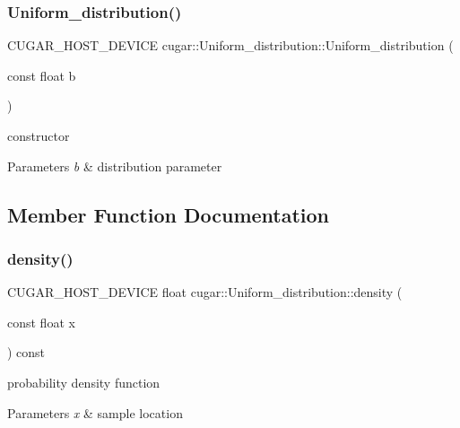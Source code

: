 \subsubsection{\texorpdfstring{Uniform\+\_\+distribution()}{Uniform\_distribution()}}
{\footnotesize\ttfamily C\+U\+G\+A\+R\+\_\+\+H\+O\+S\+T\+\_\+\+D\+E\+V\+I\+CE cugar\+::\+Uniform\+\_\+distribution\+::\+Uniform\+\_\+distribution (\begin{DoxyParamCaption}\item[{const float}]{b }\end{DoxyParamCaption})\hspace{0.3cm}{\ttfamily [inline]}}

constructor


\begin{DoxyParams}{Parameters}
{\em b} & distribution parameter \\
\hline
\end{DoxyParams}


\subsection{Member Function Documentation}
\mbox{\label{structcugar_1_1_uniform__distribution_a0f664494544db0de8c364005547862dd}} 
\subsubsection{\texorpdfstring{density()}{density()}}
{\footnotesize\ttfamily C\+U\+G\+A\+R\+\_\+\+H\+O\+S\+T\+\_\+\+D\+E\+V\+I\+CE float cugar\+::\+Uniform\+\_\+distribution\+::density (\begin{DoxyParamCaption}\item[{const float}]{x }\end{DoxyParamCaption}) const\hspace{0.3cm}{\ttfamily [inline]}}

probability density function


\begin{DoxyParams}{Parameters}
{\em x} & sample location \\
\hline
\end{DoxyParams}
\mbox{\label{structcugar_1_1_uniform__distribution_ab9b26e8d82eee3e960ea1d7d1b54feae}} 
